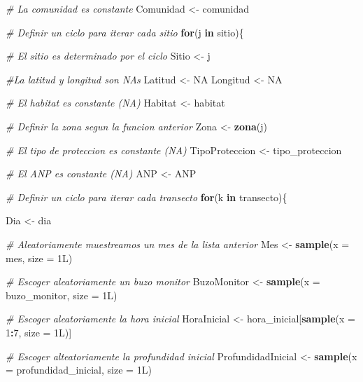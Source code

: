 \documentclass[]{krantz}
\newenvironment{Shaded}{\begin{snugshade}}{\end{snugshade}}
\newcommand{\CommentTok}[1]{\textcolor[rgb]{0.56,0.35,0.01}{\textit{#1}}}
\newcommand{\ControlFlowTok}[1]{\textcolor[rgb]{0.13,0.29,0.53}{\textbf{#1}}}
\newcommand{\DataTypeTok}[1]{\textcolor[rgb]{0.13,0.29,0.53}{#1}}
\newcommand{\DecValTok}[1]{\textcolor[rgb]{0.00,0.00,0.81}{#1}}
\newcommand{\KeywordTok}[1]{\textcolor[rgb]{0.13,0.29,0.53}{\textbf{#1}}}
\newcommand{\NormalTok}[1]{#1}
\newcommand{\OperatorTok}[1]{\textcolor[rgb]{0.81,0.36,0.00}{\textbf{#1}}}
\newcommand{\OtherTok}[1]{\textcolor[rgb]{0.56,0.35,0.01}{#1}}
\newcommand{\StringTok}[1]{\textcolor[rgb]{0.31,0.60,0.02}{#1}}
\begin{document}
\begin{Shaded}
\begin{Highlighting}[]
  \CommentTok{# La comunidad es constante}
\NormalTok{  Comunidad <-}\StringTok{ }\NormalTok{comunidad}
  
  \CommentTok{# Definir un ciclo para iterar cada sitio}
  \ControlFlowTok{for}\NormalTok{(j }\ControlFlowTok{in}\NormalTok{ sitio)\{}
    
    \CommentTok{# El sitio es determinado por el ciclo}
\NormalTok{    Sitio <-}\StringTok{ }\NormalTok{j}
    
    \CommentTok{#La latitud y longitud son NAs}
\NormalTok{    Latitud <-}\StringTok{ }\OtherTok{NA}
\NormalTok{    Longitud <-}\StringTok{ }\OtherTok{NA}
    
    \CommentTok{# El habitat es constante (NA)}
\NormalTok{    Habitat <-}\StringTok{ }\NormalTok{habitat}
    
    \CommentTok{# Definir la zona segun la funcion anterior}
\NormalTok{    Zona <-}\StringTok{ }\KeywordTok{zona}\NormalTok{(j)}
    
    \CommentTok{# El tipo de proteccion es constante (NA)}
\NormalTok{    TipoProteccion <-}\StringTok{ }\NormalTok{tipo_proteccion}
    
    \CommentTok{# El ANP es constante (NA)}
\NormalTok{    ANP <-}\StringTok{ }\NormalTok{ANP}
    
    \CommentTok{# Definir un ciclo para iterar cada transecto}
    \ControlFlowTok{for}\NormalTok{(k }\ControlFlowTok{in}\NormalTok{ transecto)\{}
      
\NormalTok{      Dia <-}\StringTok{ }\NormalTok{dia}
      
      \CommentTok{# Aleatoriamente muestreamos un mes de la lista anterior}
\NormalTok{      Mes <-}\StringTok{ }\KeywordTok{sample}\NormalTok{(}\DataTypeTok{x =}\NormalTok{ mes,}
                    \DataTypeTok{size =}\NormalTok{ 1L)}
      
      \CommentTok{# Escoger aleatoriamente un buzo monitor}
\NormalTok{      BuzoMonitor <-}\StringTok{ }\KeywordTok{sample}\NormalTok{(}\DataTypeTok{x =}\NormalTok{ buzo_monitor,}
                            \DataTypeTok{size =}\NormalTok{ 1L)}
      
      \CommentTok{# Escoger aleatoriamente la hora inicial}
\NormalTok{      HoraInicial <-}\StringTok{ }\NormalTok{hora_inicial[}\KeywordTok{sample}\NormalTok{(}\DataTypeTok{x =} \DecValTok{1}\OperatorTok{:}\DecValTok{7}\NormalTok{,}
                                         \DataTypeTok{size =}\NormalTok{ 1L)]}
      
      \CommentTok{# Escoger alteatoriamente la profundidad inicial}
\NormalTok{      ProfundidadInicial <-}\StringTok{ }\KeywordTok{sample}\NormalTok{(}\DataTypeTok{x =}\NormalTok{ profundidad_inicial,}
                                   \DataTypeTok{size =}\NormalTok{ 1L)}
      

\end{Highlighting}
\end{Shaded}
\end{document}
